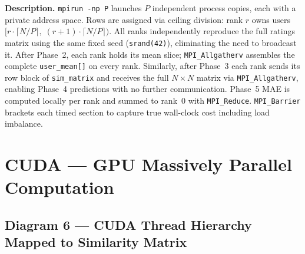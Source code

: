 \documentclass[12pt,a4paper]{article}
\begin{document}
\begin{mdframed}[style=descbox]
\textbf{Description.}  \texttt{mpirun -np P} launches $P$ independent
process copies, each with a private address space.  Rows are assigned via
ceiling division: rank $r$ owns users $[r \cdot \lceil N/P \rceil,\; (r{+}1)
\cdot \lceil N/P \rceil)$.  All ranks independently reproduce the full
ratings matrix using the same fixed seed (\texttt{srand(42)}), eliminating
the need to broadcast it.  After Phase~2, each rank holds its mean slice;
\texttt{MPI\_Allgatherv} assembles the complete \texttt{user\_mean[]} on
every rank.  Similarly, after Phase~3 each rank sends its row block of
\texttt{sim\_matrix} and receives the full $N \times N$ matrix via
\texttt{MPI\_Allgatherv}, enabling Phase~4 predictions with no further
communication.  Phase~5 MAE is computed locally per rank and summed to
rank~0 with \texttt{MPI\_Reduce}.  \texttt{MPI\_Barrier} brackets each
timed section to capture true wall-clock cost including load imbalance.
\end{mdframed}

\newpage

\section{CUDA — GPU Massively Parallel Computation}

\subsection*{Diagram 6 — CUDA Thread Hierarchy Mapped to Similarity Matrix}
\end{document}

